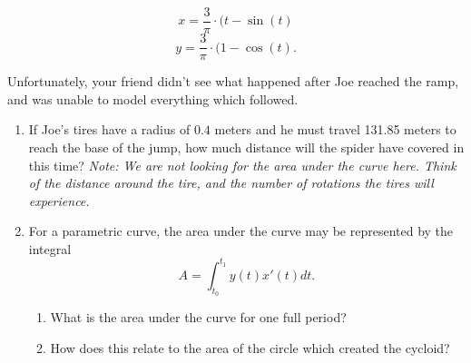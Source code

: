 \documentclass{ximera}
\begin{document}
\begin{enumerate}
$$x = \dfrac{3}{\pi} \cdot (t - \sin(t)$$ $$y = \dfrac{3}{\pi} \cdot (1 - \cos(t)\text{.}$$

Unfortunately, your friend didn't see what happened after Joe reached the ramp, and was unable to model everything which followed.
\begin{enumerate}
\item If Joe's tires have a radius of $0.4$ meters and he must travel 131.85 meters to reach the base of the jump, how much distance will the spider have covered in this time? \textit{Note: We are not looking for the area under the curve here. Think of the distance around the tire, and the number of rotations the tires will experience.}
\item For a parametric curve, the area under the curve may be represented by the integral $$A = \int_{t_0}^{t_1} y(t)x'(t) dt \text{.}$$
\begin{enumerate}
\item What is the area under the curve for one full period?
\item How does this relate to the area of the circle which created the cycloid?
\end{enumerate}
\end{enumerate}
\end{enumerate}
\end{document}
